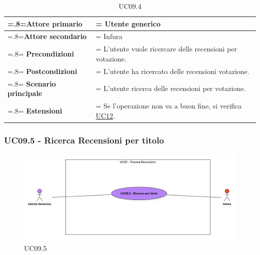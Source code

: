             \begin{table}[H]
                \centering
                \renewcommand{\arraystretch}{1.8}
                \renewcommand\tabularxcolumn[1]{m{#1}}
                \begin{tabularx}{0.9\textwidth} {
                    >{\hsize=.8\hsize\linewidth=\hsize}X
                    >{\hsize=1.2\hsize\linewidth=\hsize}X}
                    \hline
                    \textbf{Attore primario} & Utente generico \\
                    \hline
                    \textbf{Attore secondario} & Infura \\
                    \hline
                    \textbf{Precondizioni} & L'utente vuole ricercare delle recensioni per votazione. \\
                    \hline
                    \textbf{Postcondizioni} & L'utente ha ricercato delle recensioni votazione. \\
                    \hline
                    \textbf{Scenario principale} & L'utente ricerca delle recensioni per votazione.\\
                    \hline
                    \textbf{Estensioni} & Se l'operazione non va a buon fine, si verifica \hyperref[UC12]{UC12}. \\
                    \hline
                \end{tabularx}
                \caption{UC09.4}
            \end{table}

        \subsubsection{UC09.5 - Ricerca Recensioni per titolo}
        \label{UC09.5}

            \begin{figure}[H]
                \centering
                \includegraphics[scale=0.6]{src/img/UC09.5.png}
                \caption{UC09.5}
            \end{figure}

